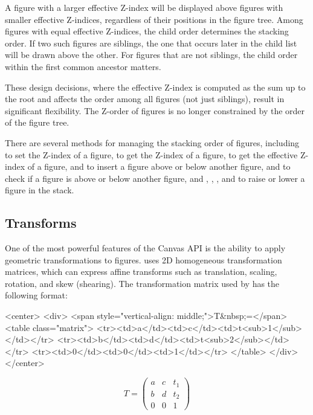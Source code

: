 A figure with a larger effective Z-index will be displayed above figures with
smaller effective Z-indices, regardless of their positions in the figure tree.
Among figures with equal effective Z-indices, the child order determines the
stacking order. If two such figures are siblings, the one that occurs later in
the child list will be drawn above the other. For figures that are not siblings,
the child order within the first common ancestor matters.

These design decisions, where the effective Z-index is computed as the sum up to
the root and affects the order among all figures (not just siblings), result in
significant flexibility. The Z-order of figures is no longer constrained by the
order of the figure tree.

There are several methods for managing the stacking order of figures, including
 to set the Z-index of a figure,  to get
the Z-index of a figure,  to get the effective
Z-index of a figure,  and  to insert a
figure above or below another figure,  and  to
check if a figure is above or below another figure, and ,
, , and  to raise
or lower a figure in the stack.


\subsection{Transforms}
\label{sec:graphics:canvas-transforms}

One of the most powerful features of the Canvas API is the ability to apply
geometric transformations to figures. {\opp} uses 2D homogeneous transformation
matrices, which can express affine transforms such as translation, scaling,
rotation, and skew (shearing). The transformation matrix used by {\opp} has the
following format:

\begin{htmlonly}
<center>
<div>
<span style="vertical-align: middle;">T&nbsp;=</span>
<table class="matrix">
  <tr><td>a</td><td>c</td><td>t<sub>1</sub></td></tr>
  <tr><td>b</td><td>d</td><td>t<sub>2</sub></td></tr>
  <tr><td>0</td><td>0</td><td>1</td></tr>
</table>
</div>
</center>
\end{htmlonly}

\begin{pdfonly}
\[ T = \left( \begin{array}{ccc}
a & c & t_1 \\
b & d & t_2 \\
0 & 0 & 1 \end{array} \right)\]
\end{pdfonly}

